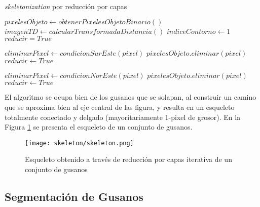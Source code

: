 \begin{algorithm}                     
\caption{\emph{skeletonization} por reducci\'on por capas}         
\label{thinninalg}                    
\begin{algorithmic}                   
\STATE $pixelesObjeto \leftarrow obtenerPixelesObjetoBinario()$
\STATE $imagenTD \leftarrow calcularTransformadaDistancia()$
\STATE $indiceContorno \leftarrow 1$
\STATE $reducir = True$


\STATE {}
\STATE {}
\ELSE
\STATE $eliminarPixel \leftarrow condicionSurEste(pixel)$
\STATE $pixelesObjeto.eliminar(pixel)$
\STATE $reducir \leftarrow True$
\ENDIF

\ENDIF
\ENDFOR


\STATE {}
\STATE {}
\ELSE
\STATE $eliminarPixel \leftarrow condicionNorEste(pixel)$
\STATE $pixelesObjeto.eliminar(pixel)$
\STATE $reducir \leftarrow True$
\ENDIF
\ENDIF
\ENDFOR
\ENDWHILE
\STATE 
{}

\end{algorithmic}
\end{algorithm}

El algoritmo se ocupa bien de los gusanos que se solapan, al construir un camino que 
se aproxima bien al eje central de las figura, y resulta en un esqueleto totalmente
conectado y delgado (mayoritariamente 1-pixel de grosor).
En la Figura \ref{fig:skeleton} se presenta el esqueleto de un conjunto de gusanos.

\begin{figure}[h t b p ! H]
 \centering
   \texttt{[image: skeleton/skeleton.png]}
 \caption{Esqueleto obtenido a trav\'es de reducci\'on por capas iterativa
   de un conjunto de gusanos}
\label{fig:skeleton}
\end{figure} 

\subsection{Segmentaci\'on de Gusanos}
\label{sec:metsegmentation}

